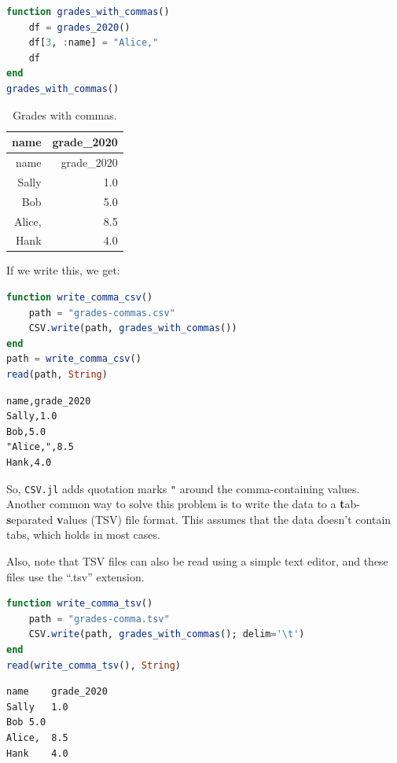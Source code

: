 \documentclass[
  notoc %
]{tufte-book}
\newcommand{\passthrough}[1]{#1}
\begin{document}
\begin{lstlisting}[language=Julia]
function grades_with_commas()
    df = grades_2020()
    df[3, :name] = "Alice,"
    df
end
grades_with_commas()
\end{lstlisting}

\hypertarget{tbl:grades_with_commas}{}
\begin{longtable}[]{@{}rr@{}}
\caption{\label{tbl:grades_with_commas}Grades with
commas.}\tabularnewline
\toprule()
name & grade\_2020 \\
\midrule()
\endfirsthead
\toprule()
name & grade\_2020 \\
\midrule()
\endhead
Sally & 1.0 \\
Bob & 5.0 \\
Alice, & 8.5 \\
Hank & 4.0 \\
\bottomrule()
\end{longtable}

If we write this, we get:

\begin{lstlisting}[language=Julia]
function write_comma_csv()
    path = "grades-commas.csv"
    CSV.write(path, grades_with_commas())
end
path = write_comma_csv()
read(path, String)
\end{lstlisting}

\begin{lstlisting}[language=Output]
name,grade_2020
Sally,1.0
Bob,5.0
"Alice,",8.5
Hank,4.0

\end{lstlisting}

So, \passthrough{\lstinline!CSV.jl!} adds quotation marks
\passthrough{\lstinline!"!} around the comma-containing values. Another
common way to solve this problem is to write the data to a
\textbf{t}ab-\textbf{s}eparated \textbf{v}alues (TSV) file format. This
assumes that the data doesn't contain tabs, which holds in most cases.

Also, note that TSV files can also be read using a simple text editor,
and these files use the ``.tsv'' extension.

\begin{lstlisting}[language=Julia]
function write_comma_tsv()
    path = "grades-comma.tsv"
    CSV.write(path, grades_with_commas(); delim='\t')
end
read(write_comma_tsv(), String)
\end{lstlisting}

\begin{lstlisting}[language=Output]
name    grade_2020
Sally   1.0
Bob 5.0
Alice,  8.5
Hank    4.0

\end{lstlisting}
\end{document}
